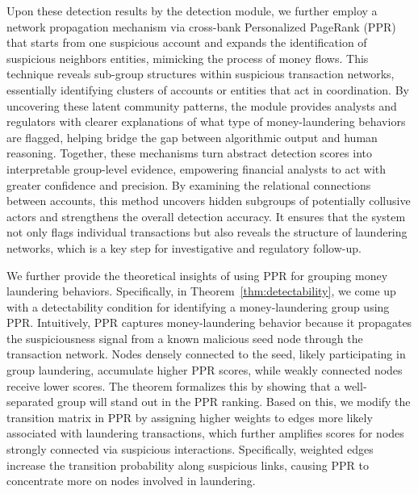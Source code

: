 Upon these detection results by the detection module, we further employ a network propagation mechanism via cross-bank Personalized PageRank (PPR) that starts from one suspicious account and expands the identification of suspicious neighbors entities, mimicking the process of money flows. This technique reveals sub-group structures within suspicious transaction networks, essentially identifying clusters of accounts or entities that act in coordination. By uncovering these latent community patterns, the module provides analysts and regulators with clearer explanations of what type of money-laundering behaviors are flagged, helping bridge the gap between algorithmic output and human reasoning. 
Together, these mechanisms turn abstract detection scores into interpretable group-level evidence, empowering financial analysts to act with greater confidence and precision. By examining the relational connections between accounts, this method uncovers hidden subgroups of potentially collusive actors and strengthens the overall detection accuracy. It ensures that the system not only flags individual transactions but also reveals the structure of laundering networks, which is a key step for investigative and regulatory follow-up. 

We further provide the theoretical insights of using PPR for grouping money laundering behaviors. Specifically, in Theorem~\ref{thm:detectability}, we come up with a detectability condition for identifying a money-laundering group using PPR. Intuitively, PPR captures money-laundering behavior because it propagates the suspiciousness signal from a known malicious seed node through the transaction network. Nodes densely connected to the seed, likely participating in group laundering, accumulate higher PPR scores, while weakly connected nodes receive lower scores. The theorem formalizes this by showing that a well-separated group will stand out in the PPR ranking. Based on this, we modify the transition matrix in PPR by assigning higher weights to edges more likely associated with laundering transactions, which further amplifies scores for nodes strongly connected via suspicious interactions. Specifically, weighted edges increase the transition probability along suspicious links, causing PPR to concentrate more on nodes involved in laundering.

